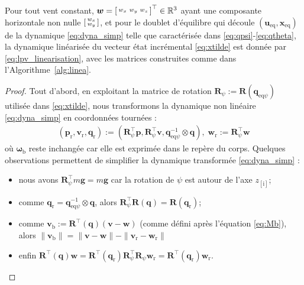 \begin{theorem} \label{th:lin}
Pour tout vent constant, $\boldsymbol{w} =\left[ \begin{smallmatrix}w_x & w_y & w_z \end{smallmatrix} \right]^\top \in {\mathbb R}^3$ ayant une composante horizontale non nulle $\left[ \begin{smallmatrix}w_x \\ w_y \end{smallmatrix} \right]$, et pour le doublet d'équilibre qui découle $(\boldsymbol{u}_{\text{eq}}, \boldsymbol{x}_{\text{eq}})$ de la dynamique \eqref{eq:dyna_simp} telle que caractérisée dans \eqref{eq:qpsi}-\eqref{eq:qtheta}, la dynamique linéarisée du vecteur état incrémental \eqref{eq:xtilde} est donnée par \eqref{eq:lpv_linearisation}, avec les matrices construites comme dans l'Algorithme~\ref{alg:linea}.
\end{theorem}
%
\begin{proof}
Tout d'abord, en exploitant la matrice de rotation 
$\boldsymbol{R}_{\psi} :=    \boldsymbol{R}(\boldsymbol{q}_{\mathrm{eq}\psi})$ utilisée dans \eqref{eq:xtilde}, nous transformons la dynamique non linéaire \eqref{eq:dyna_simp} en coordonnées tournées : 
\begin{align}
\label{eq:rotated_coord}
(\boldsymbol{p}_{\text{r}} ,
\boldsymbol{v}_{\text{r}} ,
\boldsymbol{q}_{\text{r}}
)
:=
\left(\boldsymbol{R}_{\psi}^\top
\boldsymbol{p},
\boldsymbol{R}_{\psi}^\top \boldsymbol{v},
\boldsymbol{q}_{\mathrm{eq}\psi}^{-1} \otimes
\boldsymbol{q}
\right), 
\; \boldsymbol{w}_{\text{r}}:=\boldsymbol{R}_{\psi}^\top\boldsymbol{w}
\end{align}
où $\boldsymbol{\omega}_{\text{b}}$ reste inchangée car elle est exprimée dans le repère du corps. 
Quelques observations permettent de simplifier
la dynamique transformée \eqref{eq:dyna_simp} :
\begin{itemize}
    \item nous avons $\boldsymbol{R}_{\psi}^\top
    m\boldsymbol{g} = m\boldsymbol{g}$ car la rotation de $\psi$ est autour de l'axe $z_{[\text{i}]}$;
    \item comme $\boldsymbol{q}_{\text{r}} = \boldsymbol{q}_{\mathrm{eq}\psi}^{-1} \otimes \boldsymbol{q}$, alors $\boldsymbol{R}_{\psi}^\top \boldsymbol{R}(\boldsymbol{q}) = \boldsymbol{R}(\boldsymbol{q}_{\text{r}})$; 
    \item comme $\boldsymbol{v}_{\text{b}} := \boldsymbol{R}^\top(\boldsymbol{q}) (\boldsymbol{v}-\boldsymbol{w})$ (comme défini après l'équation \eqref{eq:Mb}), alors $\| \boldsymbol{v}_{\text{b}} \| = \| \boldsymbol{v} -  \boldsymbol{w}  \| - \| \boldsymbol{v}_{\text{r}} -  \boldsymbol{w}_{\text{r}}  \|$
    \item enfin $\boldsymbol{R}^\top(\boldsymbol{q}) \boldsymbol{w} = \boldsymbol{R}^\top\! (\boldsymbol{q}_{\text{r}}) \boldsymbol{R}_{\psi}^\top\! \boldsymbol{R}_{\psi} \boldsymbol{w}_{\text{r}}= \boldsymbol{R}^\top \!(\boldsymbol{q}_{\text{r}}) \boldsymbol{w}_{\text{r}}$.
\end{itemize} 


\end{proof}
